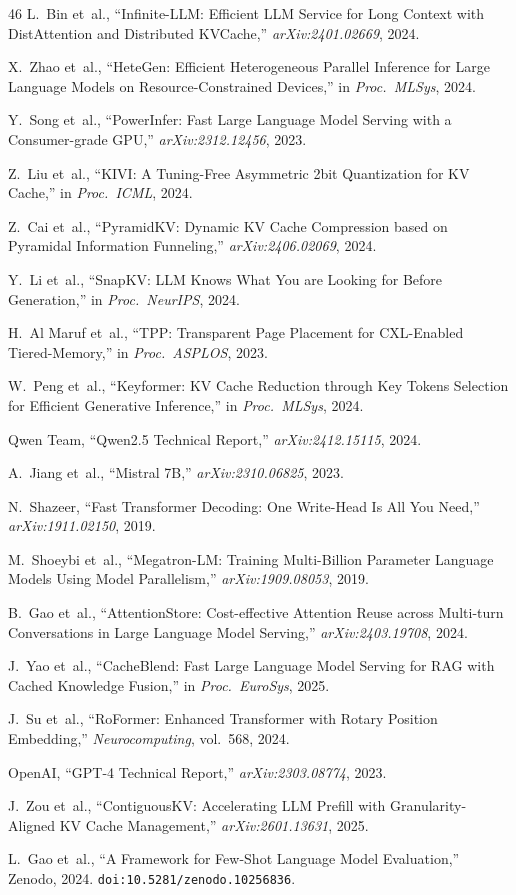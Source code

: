 \documentclass[conference]{IEEEtran}
\begin{document}
\begin{thebibliography}{46}
 L.~Bin et~al., ``Infinite-LLM: Efficient LLM Service for Long Context with DistAttention and Distributed KVCache,'' \textit{arXiv:2401.02669}, 2024.

 X.~Zhao et~al., ``HeteGen: Efficient Heterogeneous Parallel Inference for Large Language Models on Resource-Constrained Devices,'' in \textit{Proc.\ MLSys}, 2024.

 Y.~Song et~al., ``PowerInfer: Fast Large Language Model Serving with a Consumer-grade GPU,'' \textit{arXiv:2312.12456}, 2023.

 Z.~Liu et~al., ``KIVI: A Tuning-Free Asymmetric 2bit Quantization for KV Cache,'' in \textit{Proc.\ ICML}, 2024.

 Z.~Cai et~al., ``PyramidKV: Dynamic KV Cache Compression based on Pyramidal Information Funneling,'' \textit{arXiv:2406.02069}, 2024.

 Y.~Li et~al., ``SnapKV: LLM Knows What You are Looking for Before Generation,'' in \textit{Proc.\ NeurIPS}, 2024.

 H.~Al Maruf et~al., ``TPP: Transparent Page Placement for CXL-Enabled Tiered-Memory,'' in \textit{Proc.\ ASPLOS}, 2023.

 W.~Peng et~al., ``Keyformer: KV Cache Reduction through Key Tokens Selection for Efficient Generative Inference,'' in \textit{Proc.\ MLSys}, 2024.


 Qwen Team, ``Qwen2.5 Technical Report,'' \textit{arXiv:2412.15115}, 2024.

 A.~Jiang et~al., ``Mistral 7B,'' \textit{arXiv:2310.06825}, 2023.

 N.~Shazeer, ``Fast Transformer Decoding: One Write-Head Is All You Need,'' \textit{arXiv:1911.02150}, 2019.

 M.~Shoeybi et~al., ``Megatron-LM: Training Multi-Billion Parameter Language Models Using Model Parallelism,'' \textit{arXiv:1909.08053}, 2019.

 B.~Gao et~al., ``AttentionStore: Cost-effective Attention Reuse across Multi-turn Conversations in Large Language Model Serving,'' \textit{arXiv:2403.19708}, 2024.

 J.~Yao et~al., ``CacheBlend: Fast Large Language Model Serving for RAG with Cached Knowledge Fusion,'' in \textit{Proc.\ EuroSys}, 2025.


 J.~Su et~al., ``RoFormer: Enhanced Transformer with Rotary Position Embedding,'' \textit{Neurocomputing}, vol.~568, 2024.

 OpenAI, ``GPT-4 Technical Report,'' \textit{arXiv:2303.08774}, 2023.

 J.~Zou et~al., ``ContiguousKV: Accelerating LLM Prefill with Granularity-Aligned KV Cache Management,'' \textit{arXiv:2601.13631}, 2025.

 L.~Gao et~al., ``A Framework for Few-Shot Language Model Evaluation,'' Zenodo, 2024. \texttt{doi:10.5281/zenodo.10256836}.

\end{thebibliography}
\end{document}
